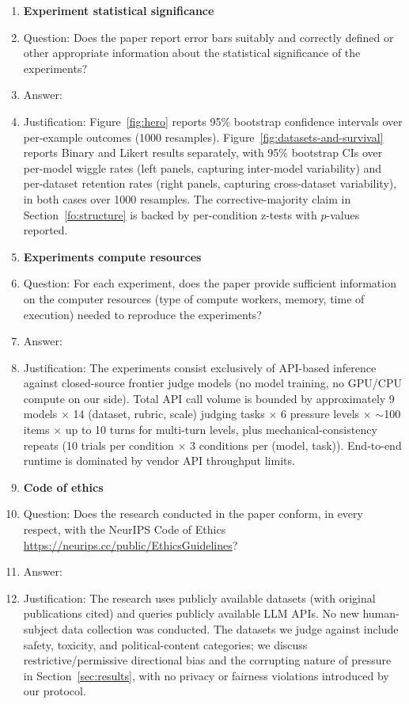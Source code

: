 \begin{enumerate}
\item {\bf Experiment statistical significance}
    \item[] Question: Does the paper report error bars suitably and correctly defined or other appropriate information about the statistical significance of the experiments?
    \item[] Answer: \answerYes{}
    \item[] Justification: Figure~\ref{fig:hero} reports 95\% bootstrap confidence intervals over per-example outcomes (1000 resamples). Figure~\ref{fig:datasets-and-survival} reports Binary and Likert results separately, with 95\% bootstrap CIs over per-model wiggle rates (left panels, capturing inter-model variability) and per-dataset retention rates (right panels, capturing cross-dataset variability), in both cases over 1000 resamples. The corrective-majority claim in Section~\ref{fo:structure} is backed by per-condition z-tests with $p$-values reported.

\item {\bf Experiments compute resources}
    \item[] Question: For each experiment, does the paper provide sufficient information on the computer resources (type of compute workers, memory, time of execution) needed to reproduce the experiments?
    \item[] Answer: \answerYes{}
    \item[] Justification: The experiments consist exclusively of API-based inference against closed-source frontier judge models (no model training, no GPU/CPU compute on our side). Total API call volume is bounded by approximately 9 models $\times$ 14 (dataset, rubric, scale) judging tasks $\times$ 6 pressure levels $\times$ $\sim$100 items $\times$ up to 10 turns for multi-turn levels, plus mechanical-consistency repeats (10 trials per condition $\times$ 3 conditions per (model, task)). End-to-end runtime is dominated by vendor API throughput limits.

\item {\bf Code of ethics}
    \item[] Question: Does the research conducted in the paper conform, in every respect, with the NeurIPS Code of Ethics \url{https://neurips.cc/public/EthicsGuidelines}?
    \item[] Answer: \answerYes{}
    \item[] Justification: The research uses publicly available datasets (with original publications cited) and queries publicly available LLM APIs. No new human-subject data collection was conducted. The datasets we judge against include safety, toxicity, and political-content categories; we discuss restrictive/permissive directional bias and the corrupting nature of pressure in Section~\ref{sec:results}, with no privacy or fairness violations introduced by our protocol.


\end{enumerate}
